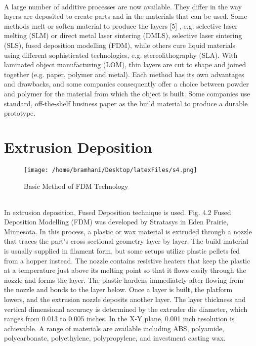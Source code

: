 \documentclass[12pt,a4paper]{report}
\begin{document}
	
	\indent
	\\A large number of additive processes are now available. They differ in the way layers are
	deposited to create parts and in the materials that can be used. Some methods melt or soften
	material to produce the layers [5] , e.g. selective laser melting (SLM) or direct metal laser sintering
	(DMLS), selective laser sintering (SLS), fused deposition modelling (FDM), while others cure
	liquid materials using different sophisticated technologies, e.g. stereolithography (SLA). With
	laminated object manufacturing (LOM), thin layers are cut to shape and joined together (e.g. paper,
	polymer and metal). Each method has its own advantages and drawbacks, and some companies
	consequently offer a choice between powder and polymer for the material from which the object is
	built. Some companies use standard, off-the-shelf business paper as the build material to produce a
	durable prototype.\par
	
	\section{Extrusion Deposition}	
	\begin{figure}[H]
		\centering
		\texttt{[image: /home/bramhani/Desktop/latexFiles/s4.png]}
		\label{fig:Basic Method of FDM Technology}
		\caption{Basic Method of FDM Technology}
	\end{figure}
	
	\noindent 
	\\In extrusion deposition, Fused Deposition technique is used. Fig. 4.2 Fused Deposition
	Modelling (FDM) was developed by Stratasys in Eden Prairie, Minnesota. In this process, a plastic
	or wax material is extruded through a nozzle that traces the part's cross sectional geometry layer by
	layer. The build material is usually supplied in filament form, but some setups utilize plastic pellets
	fed from a hopper instead. The nozzle contains resistive heaters that keep the plastic at a
	temperature just above its melting point so that it flows easily through the nozzle and forms the
	layer. The plastic hardens immediately after flowing from the nozzle and bonds to the layer below.
	Once a layer is built, the platform lowers, and the extrusion nozzle deposits another layer. The layer
	thickness and vertical dimensional accuracy is determined by the extruder die diameter, which
	ranges from 0.013 to 0.005 inches. In the X-Y plane, 0.001 inch resolution is achievable. A range of
	materials are available including ABS, polyamide, polycarbonate, polyethylene, polypropylene, and
	investment casting wax.\par
	
\end{document}
